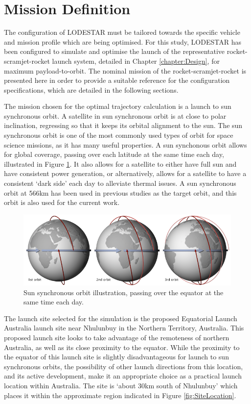 \section{Mission Definition}\label{sec:mission}
The configuration of LODESTAR must be tailored towards the specific vehicle and mission profile which are being optimised. For this study, LODESTAR has been configured to simulate and optimise the launch of the representative rocket-scramjet-rocket launch system, detailed in Chapter \ref{chapter:Design}, for maximum payload-to-orbit.
The nominal mission of the rocket-scramjet-rocket is presented here in order to provide a suitable reference for the configuration specifications, which are detailed in the following sections. 

The mission chosen for the optimal trajectory calculation is a launch to sun synchronous orbit. 
A satellite in sun synchronous orbit is at close to polar inclination, regressing so that it keeps its orbital alignment to the sun. The sun synchronous orbit is one of the most commonly used types of orbit for space science missions, as it has many useful properties\cite{Boain2004}. A sun synchonous orbit allows for global coverage, passing over each latitude at the same time each day, illustrated in Figure \ref{fig:SSO}. It also allows for a satellite to either have full sun and have consistent power generation, or alternatively, allows for a satellite to have a consistent `dark side' each day to alleviate thermal issues\cite{Boain2004}. A sun synchronous orbit at 566km has been used in previous studies as the target orbit\cite{Preller2017b}, and this orbit is also used for the current work. 
\begin{figure}[ht]
	\centering
	\includegraphics[width=0.8\linewidth]{figures/4_LODESTAR/SSO}
	\caption{Sun synchronous orbit illustration, passing over the equator at the same time each day\cite{NASASSO}.}
	\label{fig:SSO}
\end{figure}

The launch site selected for the simulation is the proposed Equatorial Launch Australia launch site near Nhulunbuy in the Northern Territory, Australia\cite{ELA}. This proposed launch site looks to take advantage of the remoteness of northern Australia, as well as its close proximity to the equator. While the proximity to the equator of this launch site is slightly disadvantageous for launch to sun synchronous orbits, the possibility of other launch directions from this location, and its active development, make it an appropriate choice as a practical launch location within Australia. The site is `about 30km south of Nhulunbuy'\cite{ELA} which places it within the approximate region indicated in Figure \ref{fig:SiteLocation}.

